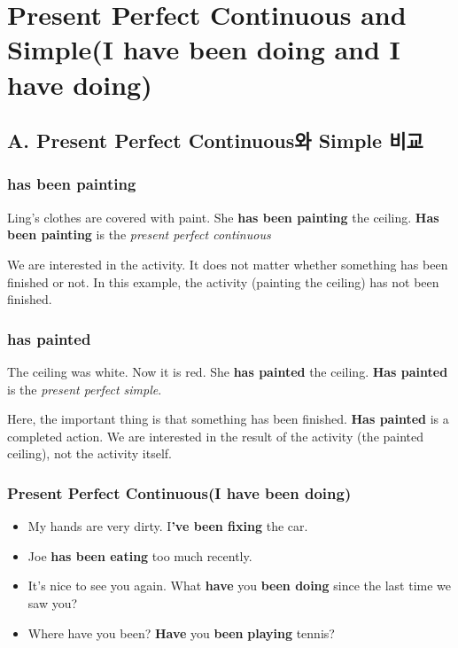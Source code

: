 \documentclass[11pt]{oblivoir}
\begin{document}
\section{Present Perfect Continuous and Simple(I have been doing and I have doing)}

\subsection{A. Present Perfect Continuous와 Simple 비교}
\subsubsection{has been painting}
Ling's clothes are covered with paint. 
She \textbf{has been painting} the ceiling.
\textbf{Has been painting} is the \textit{present perfect continuous}

We are interested in the activity. It does not matter whether something has been finished or not. In this example, the activity (painting the ceiling) has not been finished.

\subsubsection{has painted}
The ceiling was white. Now it is red. She \textbf{has painted} the ceiling. \newline
\textbf{Has painted} is the \textit{present perfect simple}. 

Here, the important thing is that something has been finished. \textbf{Has painted} is a completed action. We are interested in the result of the activity (the painted ceiling), not the activity itself.

\subsubsection{Present Perfect Continuous(I have been doing)}
\begin{itemize}
  \item My hands are very dirty. I\textbf{'ve been fixing} the car.
  \item Joe \textbf{has been eating} too much recently.
  \item It's nice to see you again. What \textbf{have} you \textbf{been doing} since the last time we saw you?
  \item Where have you been? \textbf{Have} you \textbf{been} \textbf{playing} tennis?
\end{itemize}
\end{document}
